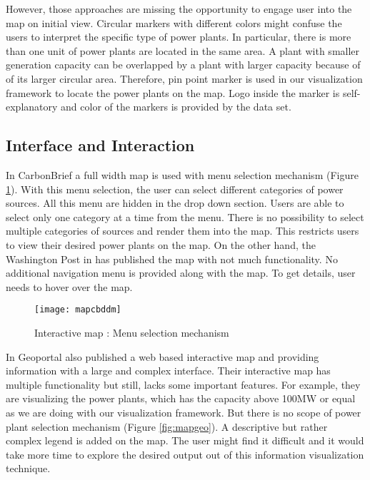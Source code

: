 However, those approaches are missing the opportunity to engage user into the map on initial view. Circular markers with different colors might confuse the users to interpret the specific type of power plants. In particular, there is more than one unit of power plants are located in the same area. A plant with smaller generation capacity can be overlapped by a plant with larger capacity because of of its larger circular area. Therefore, pin point marker is used in our visualization framework to locate the power plants on the map. Logo inside the marker is self-explanatory and color of the markers is provided by the data set.
 
\subsection*{Interface and Interaction}

In CarbonBrief \cite{cbg2016} a full width map is used with menu selection mechanism (Figure \ref{fig:mapcbm}). With this menu selection, the user can select different categories of power sources. All this menu are hidden in the drop down section. Users are able to select only one category at a time from the menu. There is no possibility to select multiple categories of sources and render them into the map. This restricts users to view their desired power plants on the map. On the other hand, the Washington Post in \cite{wp2015} has published the map with not much functionality. No additional navigation menu is provided along with the map. To get details, user needs to hover over the map.

\begin{figure}
  \begin{center}
    \texttt{[image: mapcbddm]}
    \caption{Interactive map : Menu selection mechanism}
    \label{fig:mapcbm}
  \end{center}
\end{figure}

In Geoportal \cite{gportal2016} also published a web based interactive map and providing information with a large and complex interface. Their interactive map has multiple functionality but still, lacks some important features.  For example, they are visualizing the power plants, which has the capacity above 100MW or equal as we are doing with our visualization framework. But there is no scope of power plant selection mechanism (Figure \ref{fig:mapgeo}).   
A descriptive but rather complex legend is added on the map. The user might find it difficult and it would take more time to explore the desired output out of this information visualization technique.

